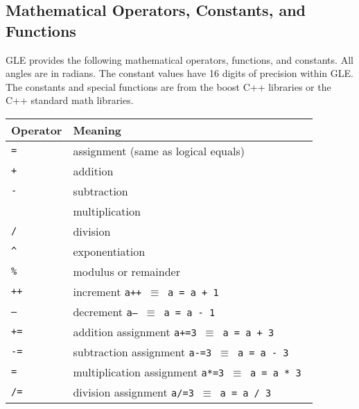 \subsection{Mathematical  Operators, Constants, and Functions}

GLE provides the following mathematical operators, functions, and constants.  All angles are in radians. The constant values have 16 digits of precision within GLE.  The constants and special functions are from the boost C++ libraries or the C++ standard math libraries.

\vspace{2ex}

\begin{tabular}{ll} \hline
Operator & Meaning  \\ \hline
{\tt =} \index{=}    & assignment (same as logical equals) \\
{\tt +} \index{+}    & addition \\
{\tt -} \index{-}    & subtraction \\
{\tt *} \index{*}    & multiplication\\
{\tt /} \index{/}    & division \\
{\tt \textasciicircum } \index{\textasciicircum}  & exponentiation \\
{\tt \%} \index{\%}  & modulus or remainder\\
{\tt ++} \index{++}  & increment {\tt a++ $\equiv$ a = a + 1 }\\
{\tt --} \index{--}  & decrement {\tt a-- $\equiv$ a = a - 1 }\\
{\tt +=} \index{+=}  & addition assignment  {\tt a+=3 $\equiv$ a = a + 3 }\\
{\tt -=} \index{-=}  & subtraction assignment {\tt a-=3 $\equiv$ a = a - 3 }\\
{\tt *=} \index{*=}  & multiplication assignment {\tt a*=3 $\equiv$ a = a * 3 }\\
{\tt /=} \index{/=}  & division assignment {\tt a/=3 $\equiv$ a = a / 3 }\\
\end{tabular}

\vspace{2ex}




